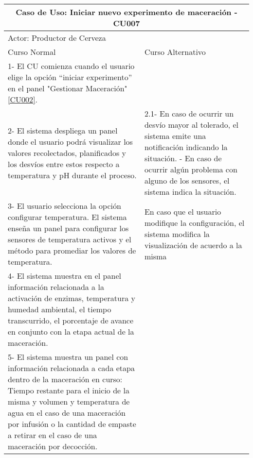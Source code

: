     
    \begin{minipage}{0.95\textwidth}
    \begin{center}
    \begin{tabularx}{\textwidth}{ | X | X |}
        \hline
        \multicolumn{2}{|c|}{\textbf{Caso de Uso: Iniciar nuevo experimento de maceración - CU007}} \\
        \hline
        \multicolumn{2}{|l|}{Actor: Productor de Cerveza} \\
        \hline
        Curso Normal & Curso Alternativo \\
        \hline
        1- El CU comienza cuando el usuario elige la opción “iniciar experimento” en el panel "Gestionar Maceración" \ref{CU002}. & \\
        \hline
        2- El sistema despliega un panel donde el usuario podrá visualizar los valores recolectados, planificados y los desvíos entre estos respecto a temperatura y pH durante el proceso.  & 2.1- En caso de ocurrir un desvío mayor al tolerado, el sistema emite una notificación indicando la situación. \newline 2.2- En caso de ocurrir algún problema con alguno de los sensores, el sistema indica la situación.
        \\
        \hline
        3- El usuario selecciona la opción configurar temperatura. El sistema enseña un panel para configurar los sensores de temperatura activos y el método para promediar los valores de temperatura. & En caso que el usuario modifique la configuración, el sistema modifica la visualización de acuerdo a la misma\\ 
        \hline
        
        4- El sistema muestra en el panel información relacionada a la activación de enzimas, temperatura y humedad ambiental, el tiempo transcurrido, el porcentaje de avance en conjunto con la etapa actual de la maceración.& \\
        \hline
        
        5- El sistema muestra un panel con información relacionada a cada etapa dentro de la maceración en curso: Tiempo restante para el inicio de la misma y volumen y temperatura de agua en el caso de una maceración por infusión o la cantidad de empaste a retirar en el caso de una maceración por decocción. & \\
        \hline
        
        \end{tabularx}
    \label{CU007_a}
    \end{center}
    \end{minipage}
    
